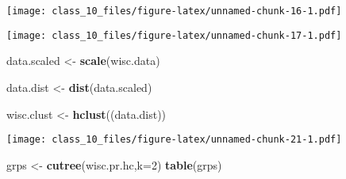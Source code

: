 \documentclass[
]{article}
\newenvironment{Shaded}{\begin{snugshade}}{\end{snugshade}}
\newcommand{\DataTypeTok}[1]{\textcolor[rgb]{0.13,0.29,0.53}{#1}}
\newcommand{\DecValTok}[1]{\textcolor[rgb]{0.00,0.00,0.81}{#1}}
\newcommand{\KeywordTok}[1]{\textcolor[rgb]{0.13,0.29,0.53}{\textbf{#1}}}
\newcommand{\NormalTok}[1]{#1}
\newcommand{\OperatorTok}[1]{\textcolor[rgb]{0.81,0.36,0.00}{\textbf{#1}}}
\newcommand{\StringTok}[1]{\textcolor[rgb]{0.31,0.60,0.02}{#1}}
\begin{document}
\texttt{[image: class\_10\_files/figure-latex/unnamed-chunk-16-1.pdf]}

\begin{Shaded}
\end{Shaded}

\texttt{[image: class\_10\_files/figure-latex/unnamed-chunk-17-1.pdf]}

\begin{Shaded}
\begin{Highlighting}[]
\NormalTok{data.scaled <-}\StringTok{ }\KeywordTok{scale}\NormalTok{(wisc.data)}
\end{Highlighting}
\end{Shaded}

\begin{Shaded}
\begin{Highlighting}[]
\NormalTok{data.dist <-}\StringTok{ }\KeywordTok{dist}\NormalTok{(data.scaled)}
\end{Highlighting}
\end{Shaded}

\begin{Shaded}
\begin{Highlighting}[]
\NormalTok{wisc.clust <-}\StringTok{ }\KeywordTok{hclust}\NormalTok{((data.dist))}
\end{Highlighting}
\end{Shaded}

\begin{Shaded}
\end{Shaded}

\texttt{[image: class\_10\_files/figure-latex/unnamed-chunk-21-1.pdf]}

\begin{Shaded}
\begin{Highlighting}[]
\NormalTok{grps <-}\StringTok{ }\KeywordTok{cutree}\NormalTok{(wisc.pr.hc,}\DataTypeTok{k=}\DecValTok{2}\NormalTok{)}
\KeywordTok{table}\NormalTok{(grps)}
\end{Highlighting}
\end{Shaded}
\end{document}
